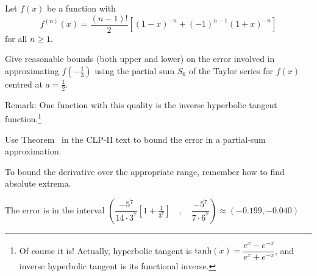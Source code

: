 \begin{question}
	Let $f(x)$ be a function with
	\[f^{(n)}(x)=\frac{(n-1)!}{2}\left[(1-x)^{-n}+(-1)^{n-1}(1+x)^{-n} \right]\]
	for all $n \ge 1$.

	Give reasonable bounds (both upper and lower) on the error involved in approximating $f\left(-\frac13 \right)$ using the partial sum $S_6$ of the Taylor series for $f(x)$ centred at $a=\frac12$.

Remark: One function with this quality is the inverse hyperbolic tangent function.\footnote{Of course it is! Actually,
hyperbolic tangent is $\mathrm{tanh}(x) = \dfrac{e^x-e^{-x}}{e^x+e^{-x}}$, and inverse hyperbolic tangent is its
functional inverse.}
\end{question}
\begin{hint}
Use Theorem~ in the CLP-II text to bound the error in a partial-sum approximation.

To bound the derivative over the appropriate range, remember how to find absolute extrema.
\end{hint}
\begin{answer}
The error is in the interval $\displaystyle\left(\dfrac{-5^7}{14\cdot 3^7}\left[1+\frac{1}{3^7} \right]\quad,\quad \dfrac{-5^7}{7\cdot 6^7} \right)\approx\left(-0.199, -0.040\right)$
\end{answer}
